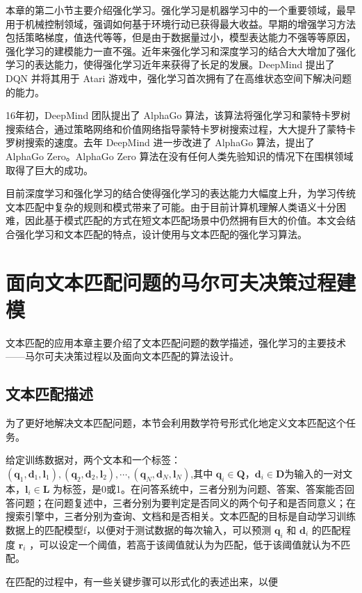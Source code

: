 本章的第二小节主要介绍强化学习。强化学习是机器学习中的一个重要领域，最早用于机械控制领域，强调如何基于环境行动已获得最大收益。早期的增强学习方法包括策略梯度，值迭代等等，但是由于数据量过小，模型表达能力不强等等原因，强化学习的建模能力一直不强。近年来强化学习和深度学习的结合大大增加了强化学习的表达能力，使得强化学习近年来获得了长足的发展。DeepMind 提出了 DQN 并将其用于 Atari 游戏中，强化学习首次拥有了在高维状态空间下解决问题的能力。

16年初，DeepMind 团队提出了 AlphaGo 算法，该算法将强化学习和蒙特卡罗树搜索结合，通过策略网络和价值网络指导蒙特卡罗树搜索过程，大大提升了蒙特卡罗树搜索的速度。去年 DeepMind 进一步改进了 AlphaGo 算法，提出了 AlphaGo Zero。AlphaGo Zero 算法在没有任何人类先验知识的情况下在围棋领域取得了巨大的成功。

目前深度学习和强化学习的结合使得强化学习的表达能力大幅度上升，为学习传统文本匹配中复杂的规则和模式带来了可能。由于目前计算机理解人类语义十分困难，因此基于模式匹配的方式在短文本匹配场景中仍然拥有巨大的价值。本文会结合强化学习和文本匹配的特点，设计使用与文本匹配的强化学习算法。

\chapter{面向文本匹配问题的马尔可夫决策过程建模}
文本匹配的应用本章主要介绍了文本匹配问题的数学描述，强化学习的主要技术——马尔可夫决策过程以及面向文本匹配的算法设计。
\section{文本匹配描述}
为了更好地解决文本匹配问题，本节会利用数学符号形式化地定义文本匹配这个任务。

给定训练数据对，两个文本和一个标签： $(\mathbf{q}_1, \mathbf{d}_1, \mathbf{l}_1), (\mathbf{q}_2, \mathbf{d}_2, \mathbf{l}_2), \cdots, (\mathbf{q}_N, \mathbf{d}_N, \mathbf{l}_N)$,其中 $\mathbf{q}_i \in \mathbf{Q}$，$\mathbf{d}_i \in \mathbf{D}$为输入的一对文本，$\mathbf{l}_i \in \mathbf{L}$ 为标签，是0或1。在问答系统中，三者分别为问题、答案、答案能否回答问题；在问题复述中，三者分别为要判定是否同义的两个句子和是否同意义；在搜索引擎中，三者分别为查询、文档和是否相关。文本匹配的目标是自动学习训练数据上的匹配模型f，以便对于测试数据的每次输入，可以预测 $\mathbf{q}_i$ 和 $\mathbf{d}_i$ 的匹配程度 $\mathbf{r}_i$ ，可以设定一个阈值，若高于该阈值就认为为匹配，低于该阈值就认为不匹配。

在匹配的过程中，有一些关键步骤可以形式化的表述出来，以便

